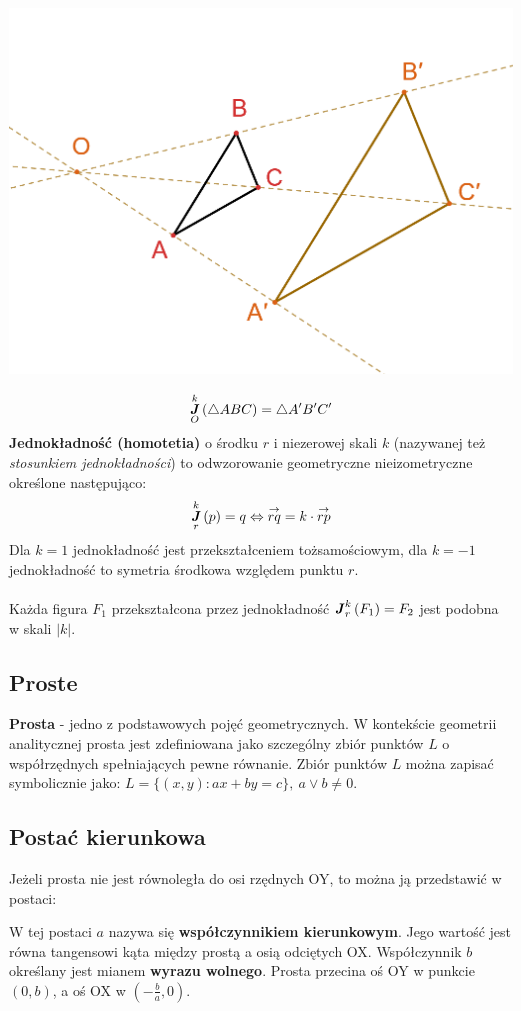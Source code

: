 \documentclass[14pt,a4paper]{extarticle}
\newcommand{\scalemath}[2][4]{\scalebox{#1}{\ensuremath{#2}}}
\newcommand{\verts}[1]{\left\lvert#1\right\rvert}
\DeclareMathOperator{\homothet}{\textbf{\textit{J}}}
\newcommand{\Hom}[3][r]{\homothet^{#2}_{#1}\left(#3\right)}
\begin{document}
\begin{center}\includegraphics[scale=0.6]{geometria/jednokładność.PNG}\end{center}
$$\Hom[O]{k}{\triangle ABC} = \triangle A^{\prime}B^{\prime}C^{\prime}$$
\noindent \textbf{Jednokładność (homotetia)} o środku $r$ i niezerowej skali $k$
(nazywanej też \textit{stosunkiem jednokładności}) to odwzorowanie geometryczne nieizometryczne określone
następująco:
$$\Hom{k}{p} = q \Leftrightarrow \overset{\rightarrow}{rq} = k\cdot\overset{\rightarrow}{rp}$$
Dla $k=1$ jednokładność jest przekształceniem tożsamościowym, dla $k=-1$ jednokładność to symetria
środkowa względem punktu $r$.\\\\
Każda figura $F_{1}$ przekształcona przez jednokładność $\Hom{k}{F_{1}} = F_{2}$ jest podobna w
skali $\verts{k}$.

\newpage
\subsection{Proste}
\noindent\textbf{Prosta} - jedno z podstawowych pojęć geometrycznych. W kontekście geometrii analitycznej
prosta jest zdefiniowana jako szczególny zbiór punktów $L$ o współrzędnych spełniających pewne równanie.
Zbiór punktów $L$ można zapisać symbolicznie jako: $L = \{(x, y): ax + by = c\},\: a \lor b \neq 0$.
\subsection*{Postać kierunkowa}
Jeżeli prosta nie jest równoległa do osi rzędnych OY, to można ją przedstawić w postaci:
\begin{center}\scalemath[1.4]{$$y = ax + b;\;\; a, b \in \mathbb{R}$$}\end{center}
\noindent W tej postaci $a$ nazywa się \textbf{współczynnikiem kierunkowym}. Jego wartość jest równa
tangensowi kąta między prostą a osią odciętych OX. Współczynnik $b$ określany jest mianem \textbf{wyrazu wolnego}.
Prosta przecina oś OY w punkcie $(0, b)$, a oś OX w $(-\frac{b}{a}, 0)$.\\
\end{document}
